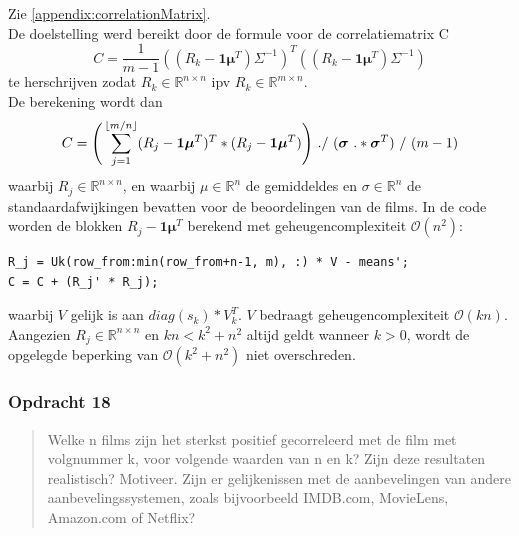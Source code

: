 \documentclass[11pt, a4paper, titlepage, openright]{article}
\DeclarePairedDelimiter\floor{\lfloor}{\rfloor}
\begin{document}
    Zie \ref{appendix:correlationMatrix}. \\
    De doelstelling werd bereikt door de formule voor de correlatiematrix C
    \[ C = \frac{1}{m - 1} ((R_k - \boldsymbol{1}\boldsymbol{\mu}^T) \Sigma^{-1})^T ((R_k - \boldsymbol{1}\boldsymbol{\mu}^T) \Sigma^{-1}) \]
    te herschrijven zodat \( R_k \in \mathbb{R}^{n \times n} \) ipv \( R_k \in \mathbb{R}^{m \times n} \). \\
    De berekening wordt dan
    \[ C = \Bigg(\sum\limits_{j=1}^{\floor{m/n}} (R_j - \boldsymbol{1}\boldsymbol{\mu}^T)^T * (R_j - \boldsymbol{1}\boldsymbol{\mu}^T)\Bigg) \ ./ \ (\boldsymbol{\sigma} \ .* \boldsymbol{\sigma}^T) \ / \ (m - 1) \]
    waarbij \( R_j \in \mathbb{R}^{n \times n} \), en waarbij \(\mu \in \mathbb{R}^{n} \) de gemiddeldes en \( \sigma \in \mathbb{R}^{n} \) de standaardafwijkingen bevatten voor de beoordelingen van de films.
    In de code worden de blokken \( R_j - \boldsymbol{1}\boldsymbol{\mu}^T \) berekend met geheugencomplexiteit \(\mathcal{O}(n^2)\):
\begin{lstlisting}[style=Matlab-editor, basicstyle = \scriptsize]
R_j = Uk(row_from:min(row_from+n-1, m), :) * V - means';
C = C + (R_j' * R_j);
\end{lstlisting}
    waarbij \(V\) gelijk is aan \( diag(s_k) * V_k^T \). \(V\) bedraagt geheugencomplexiteit \(\mathcal{O}(kn)\). \\
    Aangezien \( R_j \in \mathbb{R}^{n \times n} \) en \( kn < k^2 + n^2 \) altijd geldt wanneer \( k > 0 \),
    wordt de opgelegde beperking van \(\mathcal{O}(k^2 + n^2)\) niet overschreden.

	\subsubsection{Opdracht 18}
    \begin{quote}
        Welke n films zijn het sterkst positief gecorreleerd met de film met volgnummer k, voor volgende waarden van n en k?
        Zijn deze resultaten realistisch? Motiveer. Zijn er gelijkenissen met de aanbevelingen van andere aanbevelingssystemen,
        zoals bijvoorbeeld IMDB.com, MovieLens, Amazon.com of Netflix?
    \end{quote}
\end{document}
